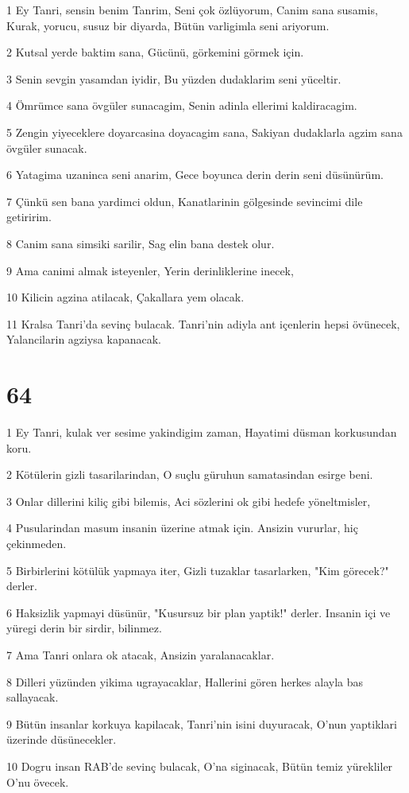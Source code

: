 \par 1 Ey Tanri, sensin benim Tanrim, Seni çok özlüyorum, Canim sana susamis, Kurak, yorucu, susuz bir diyarda, Bütün varligimla seni ariyorum.
\par 2 Kutsal yerde baktim sana, Gücünü, görkemini görmek için.
\par 3 Senin sevgin yasamdan iyidir, Bu yüzden dudaklarim seni yüceltir.
\par 4 Ömrümce sana övgüler sunacagim, Senin adinla ellerimi kaldiracagim.
\par 5 Zengin yiyeceklere doyarcasina doyacagim sana, Sakiyan dudaklarla agzim sana övgüler sunacak.
\par 6 Yatagima uzaninca seni anarim, Gece boyunca derin derin seni düsünürüm.
\par 7 Çünkü sen bana yardimci oldun, Kanatlarinin gölgesinde sevincimi dile getiririm.
\par 8 Canim sana simsiki sarilir, Sag elin bana destek olur.
\par 9 Ama canimi almak isteyenler, Yerin derinliklerine inecek,
\par 10 Kilicin agzina atilacak, Çakallara yem olacak.
\par 11 Kralsa Tanri'da sevinç bulacak. Tanri'nin adiyla ant içenlerin hepsi övünecek, Yalancilarin agziysa kapanacak.

\chapter{64}

\par 1 Ey Tanri, kulak ver sesime yakindigim zaman, Hayatimi düsman korkusundan koru.
\par 2 Kötülerin gizli tasarilarindan, O suçlu güruhun samatasindan esirge beni.
\par 3 Onlar dillerini kiliç gibi bilemis, Aci sözlerini ok gibi hedefe yöneltmisler,
\par 4 Pusularindan masum insanin üzerine atmak için. Ansizin vururlar, hiç çekinmeden.
\par 5 Birbirlerini kötülük yapmaya iter, Gizli tuzaklar tasarlarken, "Kim görecek?" derler.
\par 6 Haksizlik yapmayi düsünür, "Kusursuz bir plan yaptik!" derler. Insanin içi ve yüregi derin bir sirdir, bilinmez.
\par 7 Ama Tanri onlara ok atacak, Ansizin yaralanacaklar.
\par 8 Dilleri yüzünden yikima ugrayacaklar, Hallerini gören herkes alayla bas sallayacak.
\par 9 Bütün insanlar korkuya kapilacak, Tanri'nin isini duyuracak, O'nun yaptiklari üzerinde düsünecekler.
\par 10 Dogru insan RAB'de sevinç bulacak, O'na siginacak, Bütün temiz yürekliler O'nu övecek.

